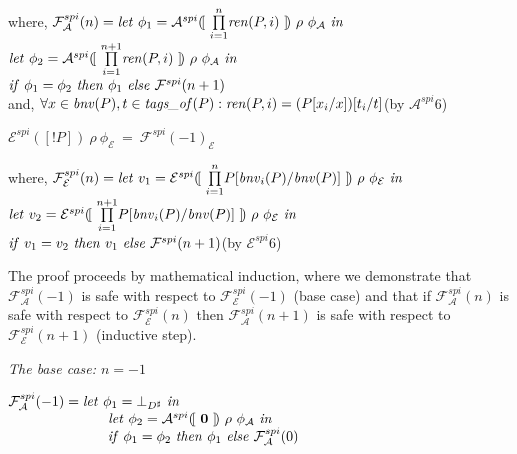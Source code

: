 \documentclass[10pt,a4paper,final,oneside,fleqn]{book}
\begin{document}
\noindent
where, $\mathcal{F}^{spi}_{\mathcal{A}}(n)=\mbox{{\itshape let\/} }\phi_1=\mathcal{A}^{spi}(\![~\underset{i=1}{\overset{n}{\prod}}\mbox{{\itshape ren\/}}(P,i)~]\!)~\rho~\phi_\mathcal{A}\mbox{ {\itshape in\/}}$\\
$\mbox{{\itshape let\/} }\phi_2=\mathcal{A}^{spi}(\![~\underset{i=1}{\overset{n+1}{\prod}}\mbox{{\itshape ren\/}}(P,i)~]\!)~\rho~\phi_\mathcal{A}\mbox{ {\itshape in\/}}$\\
$\mbox{{\itshape if\/} }\phi_1=\phi_2\mbox{ {\itshape then\/} }\phi_1\mbox{ {\itshape else\/} }\mathcal{F}^{spi}(n+1)$\\
and, $\forall x\in\mbox{{\itshape bnv\/}}(P),t\in\mbox{{\itshape tags\_of\/}}(P):\mbox{{\itshape ren\/}}(P,i)=(P[x_i/x])[{t_i}/t]$\hfill(by $\mathcal{A}^{{spi}}6$)\vspace{5mm}

\noindent
$\mathcal{E}^{spi}(\![!P]\!)~\rho~\phi_\mathcal{E}~=~\mathcal{F}^{spi}(-1)_{\mathcal{E}}$

\noindent
where, $\mathcal{F}^{spi}_{\mathcal{E}}(n)=\mbox{{\itshape let\/} }v_1=\mathcal{E}^{spi}(\![~\underset{i=1}{\overset{n}{\prod}}P[\mbox{{\itshape bnv\/}}_i(P)/\mbox{{\itshape bnv\/}}(P)]~]\!)~\rho~\phi_\mathcal{E}\mbox{ {\itshape in\/}}$\\
$\mbox{{\itshape let\/} }v_2=\mathcal{E}^{spi}(\![~\underset{i=1}{\overset{n+1}{\prod}}P[\mbox{{\itshape bnv\/}}_i(P)/\mbox{{\itshape bnv\/}}(P)]~]\!)~\rho~\phi_\mathcal{E}\mbox{ {\itshape in\/}}$\\
$\mbox{{\itshape if\/} }v_1=v_2\mbox{ {\itshape then\/} }v_1\mbox{ {\itshape else\/} }\mathcal{F}^{spi}(n+1)$\hfill(by $\mathcal{E}^{{spi}}6$)\vspace{5mm}

\noindent
The proof proceeds by mathematical induction, where we demonstrate that $\mathcal{F}_\mathcal{A}^{spi}(-1)$ is safe with respect to $\mathcal{F}_\mathcal{E}^{spi}(-1)$ (base case) and that if $\mathcal{F}_\mathcal{A}^{spi}(n)$ is safe with respect to $\mathcal{F}_\mathcal{E}^{spi}(n)$ then $\mathcal{F}_\mathcal{A}^{spi}(n+1)$ is safe with respect to $\mathcal{F}_\mathcal{E}^{spi}(n+1)$ (inductive step).\vspace{5mm}

\noindent
{\itshape The base case: $n=-1$\/}\vspace{5mm}

\noindent
$\mathcal{F}_\mathcal{A}^{spi}(-1)=\mbox{{\itshape let\/} }\phi_1=\bot_{D^\sharp}\mbox{ {\itshape in\/}}$\\
$\hspace{25mm}\mbox{{\itshape let\/} }\phi_2=\mathcal{A}^{spi}(\![~{\bf 0}~]\!)~\rho~\phi_\mathcal{A}\mbox{ {\itshape in\/}}$\\
$\hspace{25mm}\mbox{{\itshape if\/} }\phi_1=\phi_2\mbox{ {\itshape then\/} }\phi_1\mbox{ {\itshape else\/} }\mathcal{F}_\mathcal{A}^{spi}(0)$\vspace{5mm}
\end{document}
